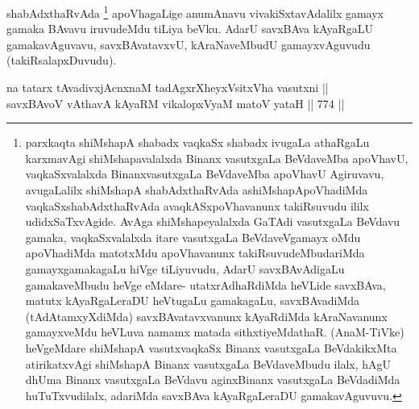 \begin{artha}
shabAdxthaRvAda \footnote[3]{parxkaqta shiMshapA shabadx vaqkaSx shabadx ivugaLa athaRgaLu karxmavAgi shiMshapavalalxda Binanx vasutxgaLa BeVdaveMba apoVhavU, vaqkaSxvalalxda BinanxvasutxgaLa BeVdaveMba apoVhavU Agiruvavu, avugaLalilx shiMshapA shabAdxthaRvAda ashiMshapApoVhadiMda vaqkaSxshabAdxthaRvAda avaqkASxpoVhavanunx takiRsuvudu ililx udidxSaTxvAgide. AvAga shiMshapeyalalxda GaTAdi vasutxgaLa BeVdavu gamaka, vaqkaSxvalalxda itare vasutxgaLa BeVdaveVgamayx oMdu apoVhadiMda matotxMdu apoVhavanunx takiRsuvudeMbudariMda gamayxgamakagaLu hiVge tiLiyuvudu, AdarU savxBAvAdigaLu gamakaveMbudu heVge eMdare- utatxrAdhaRdiMda heVLide savxBAva, matutx kAyaRgaLeraDU heVtugaLu gamakagaLu, savxBAvadiMda (tAdAtamxyXdiMda) savxBAvatavxvanunx kAyaRdiMda kAraNavanunx gamayxveMdu heVLuva namamx matada sithxtiyeMdathaR. (AnaM-TiVke) heVgeMdare shiMshapA vasutxvaqkaSx Binanx vasutxgaLa BeVdakikxMta atirikatxvAgi shiMshapA Binanx vasutxgaLa BeVdaveMbudu ilalx, hAgU dhUma Binanx vasutxgaLa BeVdavu aginxBinanx vasutxgaLa BeVdadiMda huTuTxvudilalx, adariMda savxBAva kAyaRgaLeraDU gamakavAguvuvu.} apoVhagaLige anumAnavu vivakiSxtavAdalilx gamayx gamaka BAvavu iruvudeMdu tiLiya beVku. AdarU savxBAva kAyaRgaLU gamakavAguvavu, savxBAvatavxvU, kAraNaveMbudU gamayxvAguvudu (takiRsalapxDuvudu).
\end{artha}

\begin{shl}
na tatarx tAvadivxjAcnxnaM tadAgxrXheyxV\s sitxVha vasutxni ||  \\
savxBAvoV vA\s thavA kAyaRM \footnotemark[1]vikalopxV\s yaM matoV yataH \hfill||  774 ||  
\end{shl}

